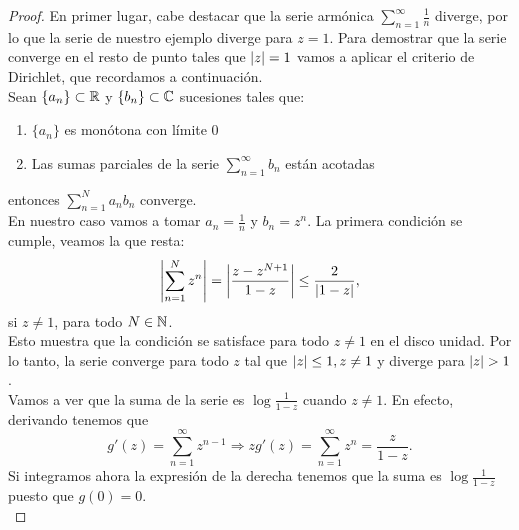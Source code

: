 \begin{proof}
    En primer lugar, cabe destacar que la serie armónica $\sum_{n=1}^{\infty} \frac{1}{n}$ diverge, por lo que la serie de nuestro ejemplo diverge para $z = 1$. Para demostrar que la serie converge en el resto de punto tales que $\left\lvert z\right\rvert = 1$ vamos a aplicar el criterio de Dirichlet, que recordamos a continuación. \\

    Sean $\{a_n\} \subset \mathbb{R}$ y $\{b_n\} \subset \mathbb{C}$ sucesiones tales que:
    \begin{enumerate}
        \item $\{a_n\}$ es monótona con límite $0$
        \item Las sumas parciales de la serie $\sum_{n=1}^{\infty} b_n$ están acotadas
    \end{enumerate}
    entonces $\sum_{n=1}^{N} a_nb_n$ converge. \\

    En nuestro caso vamos a tomar $a_n = \frac{1}{n}$ y $b_n = z^n$. La primera condición se cumple, veamos la que resta:
    \begin{equation*}
        \left\lvert\sum_{n=1}^{N} z^n\right\rvert = \left\lvert\frac{z - z^{N+1}}{1 - z}\right\rvert \leq \frac{2}{\left\lvert1 - z\right\rvert},
    \end{equation*}
    si $z \neq 1$, para todo $N \in \mathbb{N}$. \\

    Esto muestra que la condición se satisface para todo $z \not = 1$ en el disco unidad. Por lo tanto, la serie converge para todo $z$ tal que $\left\lvert z\right\rvert \leq 1, z \not = 1$ y diverge para $\left\lvert z\right\rvert > 1$. \\

    Vamos a ver que la suma de la serie es $\log{\frac{1}{1 - z}}$ cuando $z \not = 1$. En efecto, derivando tenemos que
    \begin{equation*}
        g'(z) = \sum_{n=1}^{\infty} z^{n-1} \Rightarrow z g'(z) = \sum_{n=1}^{\infty} z^n = \frac{z}{1 - z}.
    \end{equation*}
    Si integramos ahora la expresión de la derecha tenemos que la suma es $\log{\frac{1}{1 - z}}$ puesto que $g(0) = 0$. \\


\end{proof}
